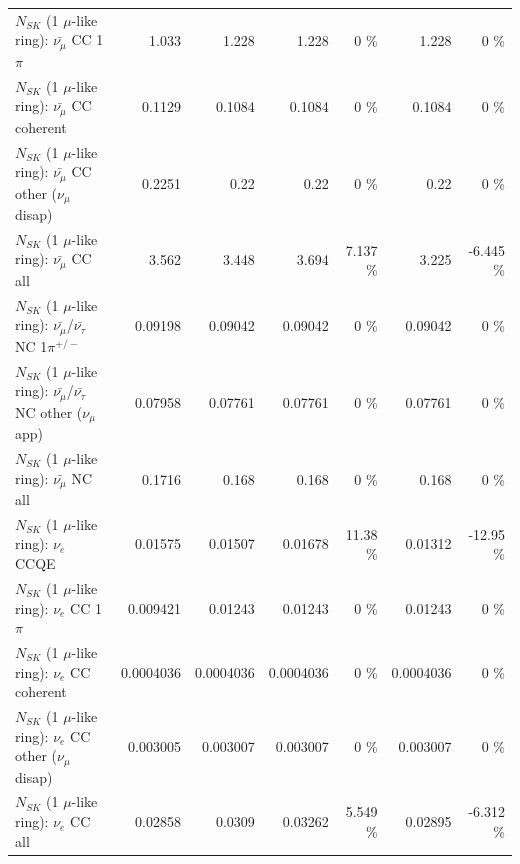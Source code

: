 \begin{table}
\begin{tabular}{| l | r | r | r  r | r  r |}
                         $N_{SK}$ (1 $\mu$-like ring): $\bar{\nu_\mu}$ CC 1$\pi$ &           1.033 &           1.228 &           1.228 &        0 \%  &           1.228 &        0 \%  \\ 
                       $N_{SK}$ (1 $\mu$-like ring): $\bar{\nu_\mu}$ CC coherent &          0.1129 &          0.1084 &          0.1084 &        0 \%  &          0.1084 &        0 \%  \\ 
        $N_{SK}$ (1 $\mu$-like ring): $\bar{\nu_\mu}$ CC other ($\nu_\mu$ disap) &          0.2251 &            0.22 &            0.22 &        0 \%  &            0.22 &        0 \%  \\ 
                          $N_{SK}$ (1 $\mu$-like ring): $\bar{\nu_{\mu}}$ CC all &           3.562 &           3.448 &           3.694 &    7.137 \%  &           3.225 &   -6.445 \%  \\ 
\hline
  $N_{SK}$ (1 $\mu$-like ring): $\bar{\nu_\mu}$/$\bar{\nu_\tau}$ NC 1$\pi^{+/-}$ &         0.09198 &         0.09042 &         0.09042 &        0 \%  &         0.09042 &        0 \%  \\ 
$N_{SK}$ (1 $\mu$-like ring): $\bar{\nu_\mu}$/$\bar{\nu_\tau}$ NC other ($\nu_\mu$ app) &         0.07958 &         0.07761 &         0.07761 &        0 \%  &         0.07761 &        0 \%  \\ 
                          $N_{SK}$ (1 $\mu$-like ring): $\bar{\nu_{\mu}}$ NC all &          0.1716 &           0.168 &           0.168 &        0 \%  &           0.168 &        0 \%  \\ 
\hline
\hline
\hline
                                      $N_{SK}$ (1 $\mu$-like ring): $\nu_e$ CCQE &         0.01575 &         0.01507 &         0.01678 &    11.38 \%  &         0.01312 &   -12.95 \%  \\ 
                                 $N_{SK}$ (1 $\mu$-like ring): $\nu_e$ CC 1$\pi$ &        0.009421 &         0.01243 &         0.01243 &        0 \%  &         0.01243 &        0 \%  \\ 
                               $N_{SK}$ (1 $\mu$-like ring): $\nu_e$ CC coherent &       0.0004036 &       0.0004036 &       0.0004036 &        0 \%  &       0.0004036 &        0 \%  \\ 
                $N_{SK}$ (1 $\mu$-like ring): $\nu_e$ CC other ($\nu_\mu$ disap) &        0.003005 &        0.003007 &        0.003007 &        0 \%  &        0.003007 &        0 \%  \\ 
                                  $N_{SK}$ (1 $\mu$-like ring): $\nu_{e}$ CC all &         0.02858 &          0.0309 &         0.03262 &    5.549 \%  &         0.02895 &   -6.312 \%  \\ 

\end{tabular}
\end{table}
